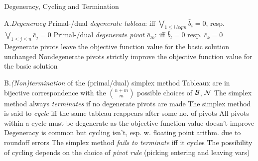\beginsection Degeneracy, Cycling and Termination

\item{A.}\emph{Degeneracy}\smallskip
{}Primal-/dual \emph{degenerate tableau}: iff $\bigvee_{1\leq i\
leq m}\bar{b}_i=0$, resp. $\bigvee_{1\leq j\leq n}\bar{c}_j=0$\smallskip
\iitem{2.}Primal-/dual \emph{degenerate pivot} $\bar{a}_{lk}$: iff $\bar{b}_l=0$
resp. $\bar{c}_k=0$\smallskip
{}Degenerate pivots leave the objective function value for the basic
solution unchanged\smallskip
{}Nondegenerate pivots strictly improve the objective function value
for the basic solution\smallskip

\item{B.}\emph{(Non)termination} of the (primal/dual) simplex method\smallskip
\iitem{1.}Tableaux are in bijective correspondence with the ${n+m\choose m}$
possible choices of ${\cal B}$, ${\cal N}$\smallskip
{}The simplex method always \emph{terminates} if no degenerate pivots
are made\smallskip
{}The simplex method is said to \emph{cycle} iff the same tableau
reappears after some no. of pivots\smallskip
{}All pivots within a cycle must be degenerate as the objective
function value doesn't improve\smallskip
{}Degeneracy is common but cycling isn't, esp. w. floating point
arithm. due to roundoff errors\smallskip
{}The simplex method \emph{fails to terminate} iff it cycles\smallskip
\iitem{5.}The possibility of cycling depends on the choice of \emph{pivot rule}
(picking entering and leaving vars)
\smallskip

